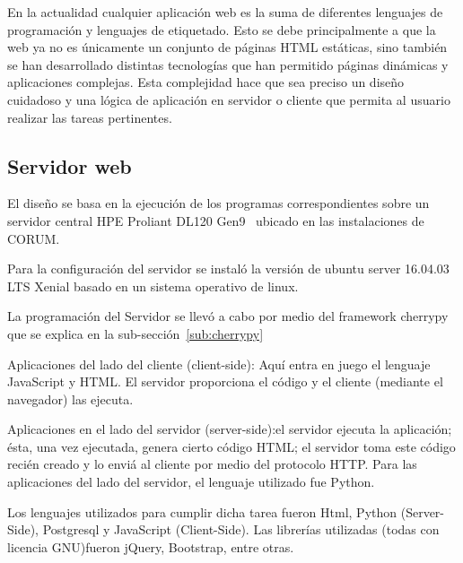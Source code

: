 \documentclass[journal,transmag]{IEEEtran}
\begin{document}
En la actualidad cualquier aplicación web es la suma de diferentes lenguajes de programación y lenguajes de etiquetado. Esto se debe principalmente a que la web ya no es únicamente un conjunto de páginas HTML estáticas, sino también se han desarrollado distintas tecnologías que han permitido páginas dinámicas y aplicaciones complejas. Esta complejidad hace que sea preciso un diseño cuidadoso y una lógica de aplicación en servidor o cliente que permita al usuario realizar las tareas pertinentes.

\subsection{Servidor web}
El diseño se basa en la ejecución de los programas correspondientes sobre un servidor central HPE Proliant DL120 Gen9~\cite{Manual2018} ubicado en las instalaciones de CORUM.

Para la configuración del servidor se instaló la versión de ubuntu server 16.04.03 LTS Xenial basado en un sistema operativo de linux.

La programación del Servidor se llevó a cabo por medio del framework cherrypy que se explica en la sub-sección~\ref{sub:cherrypy}

Aplicaciones del lado del cliente (client-side): Aquí entra en juego el lenguaje JavaScript y HTML. El servidor proporciona el código y el cliente (mediante el navegador) las ejecuta. 

Aplicaciones en el lado del servidor (server-side):el servidor ejecuta la aplicación; ésta, una vez ejecutada, genera cierto código HTML; el servidor toma este código recién creado y lo enviá al cliente por medio del protocolo HTTP. Para las aplicaciones del lado del servidor, el lenguaje utilizado fue  Python.

Los lenguajes utilizados para cumplir dicha tarea fueron Html, Python (Server-Side), Postgresql y JavaScript (Client-Side). Las librerías utilizadas (todas con licencia GNU)fueron jQuery, Bootstrap, entre otras.
\end{document}
